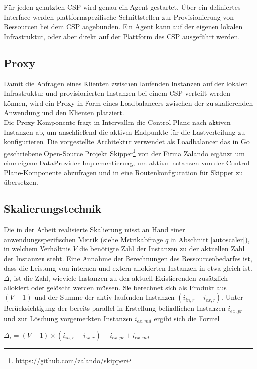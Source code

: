 \documentclass[runningheads]{llncs}
\begin{document}
Für jeden genutzten CSP wird genau ein Agent gestartet. Über ein definiertes Interface werden plattformspezifische Schnittstellen zur Provisionierung von Ressourcen bei dem CSP angebunden. Ein Agent kann auf der eigenen lokalen Infrastruktur, oder aber direkt auf der Plattform des CSP ausgeführt werden.
	
\subsection{Proxy}

Damit die Anfragen eines Klienten zwischen laufenden Instanzen auf der lokalen Infrastruktur und provisionierten Instanzen bei einem CSP verteilt werden können, wird ein Proxy in Form eines Loadbalancers zwischen der zu skalierenden Anwendung und den Klienten platziert. \\

Die Proxy-Komponente fragt in Intervallen die Control-Plane nach aktiven Instanzen ab, um anschließend die aktiven Endpunkte für die Lastverteilung zu konfigurieren. Die vorgestellte Architektur verwendet als Loadbalancer das in Go geschriebene Open-Source Projekt Skipper\footnote{https://github.com/zalando/skipper} von der Firma Zalando ergänzt um eine eigene DataProvider Implementierung, um aktive Instanzen von der Control-Plane-Komponente abzufragen und in eine Routenkonfiguration für Skipper zu übersetzen.

\subsection{Skalierungstechnik} \label{skalierungstechnik}

Die in der Arbeit realisierte Skalierung misst an Hand einer anwendungsspezifischen Metrik (siehe Metrikabfrage $q$ in Abschnitt \ref{autoscaler}), in welchem Verhältnis $V$ die benötigte Zahl der Instanzen zu der aktuellen Zahl der Instanzen steht. Eine Annahme der  Berechnungen des Ressourcenbedarfes ist, dass die Leistung von internen und extern allokierten Instanzen in etwa gleich ist.  \\

$\Delta_{i}$ ist die Zahl, wieviele Instanzen zu den aktuell Existierenden zusätzlich allokiert oder gelöscht werden müssen. Sie berechnet sich als Produkt aus $(V-1)$ und der Summe der aktiv laufenden Instanzen $(i_{in,r} + i_{ex,r})$. Unter Berücksichtigung der bereits parallel in Erstellung befindlichen Instanzen $i_{ex,pr}$ und zur Löschung vorgemerkten Instanzen $ i_{ex,md}$ ergibt sich die Formel
\begin{center}
	$\Delta_{i} = (V-1) \times (i_{in,r} + i_{ex,r}) - i_{ex,pr} + i_{ex,md}$
\end{center}
\end{document}
